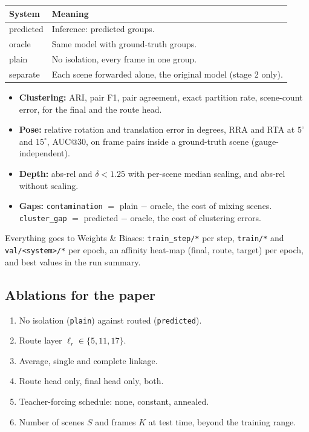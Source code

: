\documentclass[11pt, a4paper]{article}
\begin{document}
\begin{table}[h]
  \centering
  \small
  \renewcommand{\arraystretch}{1.3}
  \begin{tabularx}{\textwidth}{@{}l X@{}}
    \toprule
    \textbf{System} & \textbf{Meaning} \\
    \midrule
    predicted & Inference: predicted groups. \\
    oracle    & Same model with ground-truth groups. \\
    plain     & No isolation, every frame in one group. \\
    separate  & Each scene forwarded alone, the original model (stage 2 only). \\
    \bottomrule
  \end{tabularx}
\end{table}

\begin{itemize}
  \item \textbf{Clustering:} ARI, pair F1, pair agreement, exact partition rate, scene-count error,
        for the final and the route head.
  \item \textbf{Pose:} relative rotation and translation error in degrees, RRA and RTA at $5^\circ$
        and $15^\circ$, AUC@30, on frame pairs inside a ground-truth scene (gauge-independent).
  \item \textbf{Depth:} abs-rel and $\delta<1.25$ with per-scene median scaling, and abs-rel without scaling.
  \item \textbf{Gaps:} \texttt{contamination} $=$ plain $-$ oracle, the cost of mixing scenes.
        \texttt{cluster\_gap} $=$ predicted $-$ oracle, the cost of clustering errors.
\end{itemize}
Everything goes to Weights \& Biases: \texttt{train\_step/*} per step, \texttt{train/*} and
\texttt{val/<system>/*} per epoch, an affinity heat-map (final, route, target) per epoch, and
best values in the run summary.

\subsection{Ablations for the paper}
\begin{enumerate}
  \item No isolation (\texttt{plain}) against routed (\texttt{predicted}).
  \item Route layer $\ell_r \in \{5, 11, 17\}$.
  \item Average, single and complete linkage.
  \item Route head only, final head only, both.
  \item Teacher-forcing schedule: none, constant, annealed.
  \item Number of scenes $S$ and frames $K$ at test time, beyond the training range.
\end{enumerate}
\end{document}
